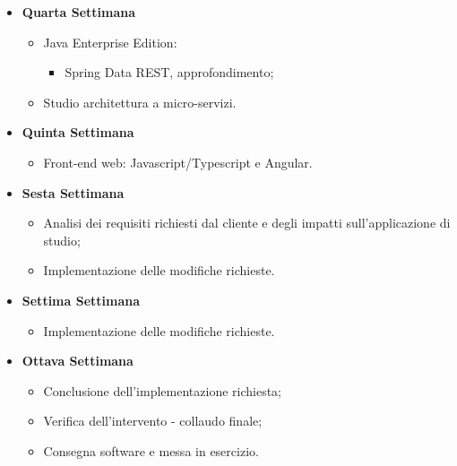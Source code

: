 {\begin{itemize}
        \item \textbf{Quarta Settimana}
        \begin{itemize}
            \item Java Enterprise Edition:
            \begin{itemize}
                \item Spring Data REST, approfondimento; %
            \end{itemize}
        \item Studio architettura a micro-servizi. %
        \end{itemize}

        \item \textbf{Quinta Settimana}
        \begin{itemize}
            \item Front-end web: Javascript/Typescript e Angular.
        \end{itemize}

        \item \textbf{Sesta Settimana}
        \begin{itemize}
            \item Analisi dei requisiti richiesti dal cliente e degli impatti sull'applicazione di studio;
            \item Implementazione delle modifiche richieste.
        \end{itemize}

        \clearpage

        \item \textbf{Settima Settimana}
        \begin{itemize}
            \item Implementazione delle modifiche richieste.
        \end{itemize}

        \item \textbf{Ottava Settimana}
        \begin{itemize}
            \item Conclusione dell'implementazione richiesta;
            \item Verifica dell'intervento - collaudo finale;
            \item Consegna software e messa in esercizio.
        \end{itemize}
    \end{itemize}
}

\newcommand{\totaleOre}{300}

